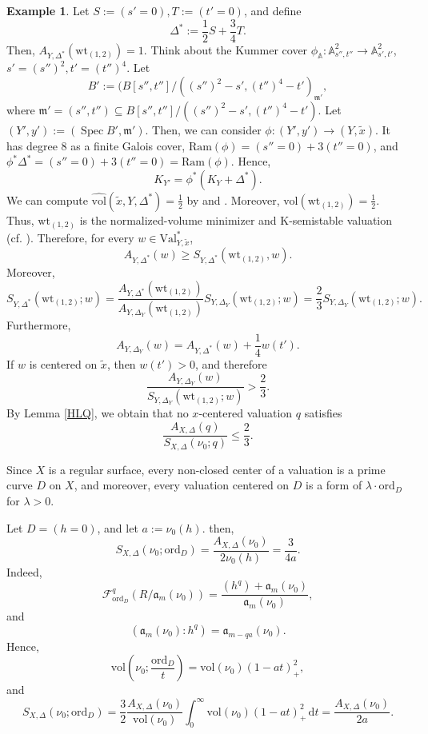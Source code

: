 \documentclass[a4paper,12pt]{amsart}
\theoremstyle{definition} %
\newtheorem{example}[theorem]{Example}
\theoremstyle{remark}
\numberwithin{equation}{section}
\newcommand{\A}{\mathbb{A}}
\def\Spec{\operatorname{Spec}}
\begin{document}
\begin{example}
\smallskip

Let $S:=(s'=0), T:=(t'=0)$, and define
$$ \Delta^*:=\frac{1}{2}S+\frac{3}{4}T.$$
Then, $A_{Y,\Delta^*}(\mathrm{wt}_{(1,2)})=1$. Think about the Kummer cover $\phi_{\A}:\A^2_{s'',t''}\to \A^2_{s',t'}$, $s'=(s'')^2,t'=(t'')^4$. Let
$$ B':=(B[s'',t'']/((s'')^2-s',(t'')^4-t')_{\mathfrak{m}'},$$
where $\mathfrak{m}'=(s'',t'')\subseteq B[s'',t'']/((s'')^2-s',(t'')^4-t')$. Let $(Y',y'):=(\Spec B',\mathfrak{m}')$. Then, we can consider $\phi:(Y',y')\to (Y,\tilde{x})$. It has degree $8$ as a finite Galois cover, $\mathrm{Ram}(\phi)=(s''=0)+3(t''=0)$, and $\phi^*\Delta^*=(s''=0)+3(t''=0)=\mathrm{Ram}(\phi)$. Hence,
$$ K_{Y'}=\phi^*(K_Y+\Delta^*).$$
We can compute $\widehat{\mathrm{vol}}(\tilde{x},Y,\Delta^*)=\frac{1}{2}$ by \cite[Theorem 1.6]{LX19} and \cite[Theorem 1.3]{XZ20}. Moreover, $\mathrm{vol}(\mathrm{wt}_{(1,2)})=\frac{1}{2}$. Thus, $\mathrm{wt}_{(1,2)}$ is the normalized-volume minimizer and K-semistable valuation (cf. \cite[Theorem 3.10]{XZ20}). Therefore, for every $w\in \mathrm{Val}^*_{Y,\tilde{x}}$,
$$ A_{Y,\Delta^*}(w)\ge S_{Y,\Delta^*}(\mathrm{wt}_{(1,2)},w).$$
Moreover,
$$ S_{Y,\Delta^*}(\mathrm{wt}_{(1,2)};w)=\frac{A_{Y,\Delta^*}(\mathrm{wt}_{(1,2)})}{A_{Y,\Delta_Y}(\mathrm{wt}_{(1,2)})}S_{Y,\Delta_Y}(\mathrm{wt}_{(1,2)};w)=\frac{2}{3}S_{Y,\Delta_Y}(\mathrm{wt}_{(1,2)};w).$$
Furthermore,
$$ A_{Y,\Delta_Y}(w)=A_{Y,\Delta^*}(w)+\frac{1}{4}w(t').$$
If $w$ is centered on $\tilde{x}$, then $w(t')>0$, and therefore
$$ \frac{A_{Y,\Delta_Y}(w)}{S_{Y,\Delta_Y}(\mathrm{wt}_{(1,2)};w)}>\frac{2}{3}.$$
By Lemma \ref{HLQ}, we obtain that no $x$-centered valuation $q$ satisfies
$$ \frac{A_{X,\Delta}(q)}{S_{X,\Delta}(\nu_0;q)}\le \frac{2}{3}.$$

\smallskip

Since $X$ is a regular surface, every non-closed center of a valuation is a prime curve $D$ on $X$, and moreover, every valuation centered on $D$ is a form of $\lambda\cdot \mathrm{ord}_D$ for $\lambda>0$.

\smallskip

Let $D=(h=0)$, and let $a:=\nu_0(h)$. then,
$$ S_{X,\Delta}(\nu_0;\mathrm{ord}_D)=\frac{A_{X,\Delta}(\nu_0)}{2\nu_0(h)}=\frac{3}{4a}.$$
Indeed,
$$ \mathcal{F}^q_{\mathrm{ord}_D}(R/\mathfrak{a}_m(\nu_0))=\frac{(h^q)+\mathfrak{a}_m(\nu_0)}{\mathfrak{a}_m(\nu_0)},$$
and
$$ (\mathfrak{a}_m(\nu_0):h^q)=\mathfrak{a}_{m-qa}(\nu_0).$$
Hence,
$$ \mathrm{vol}\left(\nu_0;\frac{\mathrm{ord}_D}{t}\right)=\mathrm{vol}(\nu_0)(1-at)^2_+,$$
and
$$ S_{X,\Delta}(\nu_0;\mathrm{ord}_D)=\frac{3}{2}\frac{A_{X,\Delta}(\nu_0)}{\mathrm{vol}(\nu_0)}\int^{\infty}_0\mathrm{vol}(\nu_0)(1-at)^2_+ \,\mathrm{d}t=\frac{A_{X,\Delta}(\nu_0)}{2a}.$$
\smallskip


\end{example}
\end{document}
